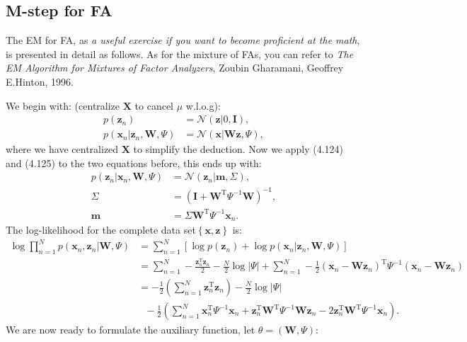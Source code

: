 \documentclass[UTF8]{ctexart}
\begin{document}
\subsection{M-step for FA}
The EM for FA, as \emph{a useful exercise if you want to become proficient at the math}, is presented in detail as follows. 
As for the mixture of FAs, you can refer to \emph{The EM Algorithm for Mixtures of Factor Analyzers}, Zoubin Gharamani, Geoffrey E.Hinton, 1996.

We begin with: (centralize $\textbf{X}$ to cancel $\mu$ w.l.o.g):
$$
\begin{aligned}
p(\textbf{z}_{n})&=\mathcal{N}(\textbf{z}|0,\textbf{I}),\\
p(\textbf{x}_{n}|\textbf{z}_{n},\textbf{W},\Psi)&=\mathcal{N}(\textbf{x}|\textbf{W}\textbf{z},\Psi),
\end{aligned}
$$
where we have centralized $\textbf{X}$ to simplify the deduction. 
Now we apply (4.124) and (4.125) to the two equations before, this ends up with:
$$
\begin{aligned}
p(\textbf{z}_{n}|\textbf{x}_{n},\textbf{W},\Psi)&=\mathcal{N}(\textbf{z}_{n}|\textbf{m},\Sigma),\\
\Sigma&=(\textbf{I}+\textbf{W}^{\text{T}}\Psi^{-1}\textbf{W})^{-1},\\
\textbf{m}&=\Sigma\textbf{W}^{\text{T}}\Psi^{-1}\textbf{x}_{n}.
\end{aligned}
$$
The log-likelihood for the complete data set$\left\{ \textbf{x},\textbf{z} \right\}$ is:
$$
\begin{aligned}
\log \prod_{n=1}^{N}p(\textbf{x}_{n},\textbf{z}_{n}|\textbf{W},\Psi)&=\sum_{n=1}^{N}\left[\log p(\textbf{z}_{n})+\log p(\textbf{x}_{n}|\textbf{z}_{n},\textbf{W},\Psi)\right]\\
&=\sum_{n=1}^{N}-\frac{\textbf{z}_{n}^{\text{T}}\textbf{z}_{n}}{2}-\frac{N}{2}\log |\Psi|+\sum_{n=1}^{N}-\frac{1}{2}\left(\textbf{x}_{n}-\textbf{W}\textbf{z}_{n}\right)^{\text{T}}\Psi^{-1}\left(\textbf{x}_{n}-\textbf{W}\textbf{z}_{n}\right)\\
&=-\frac{1}{2}\left(\sum_{n=1}^{N}\textbf{z}_{n}^{\text{T}}\textbf{z}_{n}\right)-\frac{N}{2}\log|\Psi|\\
&\ \ \ -\frac{1}{2}\left(\sum_{n=1}^{N}\textbf{x}_{n}^{\text{T}}\Psi^{-1}\textbf{x}_{n}+\textbf{z}_{n}^{\text{T}}\textbf{W}^{\text{T}}\Psi^{-1}\textbf{W}\textbf{z}_{n}-2\textbf{z}_{n}^{\text{T}}\textbf{W}^{\text{T}}\Psi^{-1}\textbf{x}_{n} \right).
\end{aligned}
$$
We are now ready to formulate the auxiliary function, let $\theta=(\textbf{W},\Psi)$:
\end{document}
